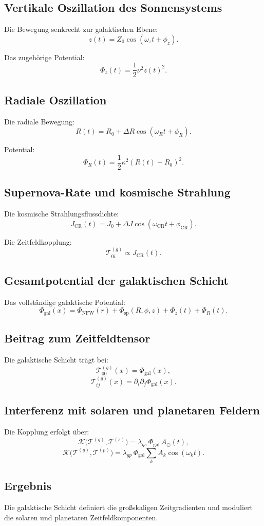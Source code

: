 \subsection{Vertikale Oszillation des Sonnensystems}

Die Bewegung senkrecht zur galaktischen Ebene:
\[
z(t) = Z_0 \cos(\omega_z t + \phi_z).
\]

Das zugehörige Potential:
\[
\Phi_z(t) = \frac{1}{2} \nu^2 z(t)^2.
\]

\subsection{Radiale Oszillation}

Die radiale Bewegung:
\[
R(t) = R_0 + \Delta R \cos(\omega_R t + \phi_R).
\]

Potential:
\[
\Phi_R(t) = \frac{1}{2} \kappa^2 (R(t) - R_0)^2.
\]

\subsection{Supernova-Rate und kosmische Strahlung}

Die kosmische Strahlungsflussdichte:
\[
J_{\text{CR}}(t) = J_0 + \Delta J \cos(\omega_{\text{CR}} t + \phi_{\text{CR}}).
\]

Die Zeitfeldkopplung:
\[
\mathcal{T}^{(g)}_{0i} \propto J_{\text{CR}}(t).
\]

\subsection{Gesamtpotential der galaktischen Schicht}

Das vollständige galaktische Potential:
\[
\Phi_{\text{gal}}(x) =
\Phi_{\text{NFW}}(r)
+ \Phi_{\text{sp}}(R,\phi,z)
+ \Phi_z(t)
+ \Phi_R(t).
\]

\subsection{Beitrag zum Zeitfeldtensor}

Die galaktische Schicht trägt bei:
\[
\mathcal{T}^{(g)}_{00}(x) = \Phi_{\text{gal}}(x),
\]
\[
\mathcal{T}^{(g)}_{ij}(x) = \partial_i \partial_j \Phi_{\text{gal}}(x).
\]

\subsection{Interferenz mit solaren und planetaren Feldern}

Die Kopplung erfolgt über:
\[
\mathcal{K}\big(\mathcal{T}^{(g)}, \mathcal{T}^{(s)}\big)
= \lambda_{gs} \, \Phi_{\text{gal}} \, A_{\odot}(t),
\]
\[
\mathcal{K}\big(\mathcal{T}^{(g)}, \mathcal{T}^{(p)}\big)
= \lambda_{gp} \, \Phi_{\text{gal}} \sum_k A_k \cos(\omega_k t).
\]

\subsection{Ergebnis}

Die galaktische Schicht definiert die großskaligen Zeitgradienten und
moduliert die solaren und planetaren Zeitfeldkomponenten.
